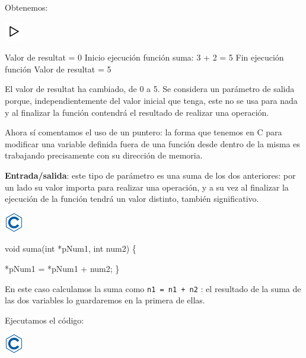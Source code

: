 \documentclass[]{book}
\newenvironment{Shaded}{\begin{snugshade}}{\end{snugshade}}
\newcommand{\DataTypeTok}[1]{\textcolor[rgb]{0.13,0.29,0.53}{#1}}
\newcommand{\DecValTok}[1]{\textcolor[rgb]{0.00,0.00,0.81}{#1}}
\newcommand{\NormalTok}[1]{#1}
\begin{document}
Obtenemos:

\includegraphics{./img/play.png}

\begin{Shaded}
\begin{Highlighting}[]
\NormalTok{Valor de resultat = }\DecValTok{0}
\NormalTok{Inicio ejecución función}
\NormalTok{suma: }\DecValTok{3}\NormalTok{ + }\DecValTok{2}\NormalTok{ = }\DecValTok{5}
\NormalTok{Fin ejecución función}
\NormalTok{Valor de resultat = }\DecValTok{5}
\end{Highlighting}
\end{Shaded}

El valor de resultat ha cambiado, de 0 a 5. Se considera un parámetro de
salida porque, independientemente del valor inicial que tenga, este no
se usa para nada y al finalizar la función contendrá el resultado de
realizar una operación.

Ahora sí comentamos el uso de un puntero: la forma que tenemos en C para
modificar una variable definida fuera de una función desde dentro de la
misma es trabajando precisamente con su dirección de memoria.

\textbf{Entrada/salida}: este tipo de parámetro es una suma de los dos
anteriores: por un lado su valor importa para realizar una operación, y
a su vez al finalizar la ejecución de la función tendrá un valor
distinto, también significativo.

\includegraphics{./img/c.png}

\begin{Shaded}
\begin{Highlighting}[]
\DataTypeTok{void}\NormalTok{ suma(}\DataTypeTok{int}\NormalTok{ *pNum1, }\DataTypeTok{int}\NormalTok{ num2) \{}

\NormalTok{    *pNum1 = *pNum1 + num2;}
\NormalTok{\}}
\end{Highlighting}
\end{Shaded}

En este caso calculamos la suma como \texttt{n1\ =\ n1\ +\ n2} : el
resultado de la suma de las dos variables lo guardaremos en la primera
de ellas.

Ejecutamos el código:

\includegraphics{./img/c.png}
\end{document}
